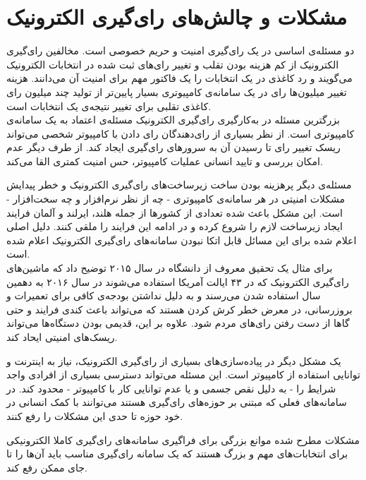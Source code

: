 \section{مشکلات و چالش‌های رای‌گیری الکترونیک}
\par
دو مسئله‌ی اساسی در یک رای‌گیری امنیت و حریم خصوصی است. مخالفین رای‌گیری الکترونیک از کم هزینه بودن تقلب و تغییر رای‌های ثبت شده در انتخابات الکترونیک می‌گویند و رد کاغذی در یک انتخابات را یک فاکتور مهم برای امنیت آن می‌دانند. هزینه تغییر میلیون‌ها رای در یک سامانه‌ی کامپیوتری بسیار پایین‌تر از تولید چند میلیون رای کاغذی تقلبی برای تغییر نتیجه‌ی یک انتخابات است.
\\
بزرگترین مسئله در به‌کارگیری رای‌گیری الکترونیک مسئله‌ی اعتماد به یک سامانه‌ی‌ کامپیوتری است. از نظر بسیاری از رای‌دهندگان رای دادن با کامپیوتر شخصی می‌تواند ریسک تغییر رای تا رسیدن آن به سرور‌های رای‌گیری ایجاد کند. از طرف دیگر عدم امکان بررسی و تایید انسانی عملیات کامپیوتر، حس امنیت کمتری القا می‌کند.
\par
مسئله‌ی دیگر پرهزینه بودن ساخت زیرساخت‌های رای‌گیری الکترونیک و خطر پیدایش مشکلات امنیتی در هر سامانه‌ی کامپیوتری - چه از نظر نرم‌افزار و چه سخت‌افزار - است. این مشکل باعث شده تعدادی از کشور‌ها از جمله هلند، ایرلند و آلمان فرایند ایجاد زیرساخت لازم را شروع کرده و در ادامه این فرایند را ملقی کنند. دلیل اصلی اعلام شده برای این مسائل‌ قابل اتکا نبودن سامانه‌های رای‌گیری الکترونیک اعلام شده است. 
\\
برای مثال یک تحقیق معروف از دانشگاه‌  در سال ۲۰۱۵ 
توضیح داد که ماشین‌های رای‌گیری الکترونیک که در ۴۳ ایالت آمریکا استفاده می‌شوند در سال ۲۰۱۶ به دهمین سال استفاده شدن می‌رسند و به دلیل نداشتن بودجه‌ی کافی برای تعمیرات و بروزرسانی، در معرض خطر کرش
 کردن هستند که می‌تواند باعث کندی فرایند و حتی گاها از دست رفتن را‌ی‌های مردم شود. علاوه بر این، قدیمی بودن دستگاه‌ها می‌تواند ریسک‌های امنیتی ایحاد کند. 

\par
یک مشکل دیگر در پیاده‌سازی‌های بسیاری از رای‌گیری الکترونیک، نیاز به اینترنت و توانایی استفاده از کامپیوتر است. این مسئله می‌تواند دسترسی بسیاری از افرادی واجد شرایط را - به دلیل نقص جسمی و یا عدم توانایی کار با کامپیوتر - محدود کند. در سامانه‌های فعلی که مبتنی بر حوزه‌های رای‌گیری هستند می‌توانند با کمک انسانی در خود حوزه تا حدی این مشکلات را رفع کنند. 
\par
مشکلات مطرح‌ شده موانع بزرگی برای فراگیری سامانه‌های رای‌گیری کاملا الکترونیکی برای انتخابات‌های مهم و بزرگ هستند که یک سامانه رای‌گیری مناسب باید آن‌ها را تا جای ممکن رفع کند. 

